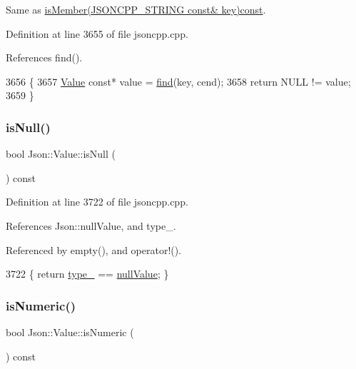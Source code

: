 Same as \hyperlink{class_json_1_1_value_a0c2cd838217b23ee6bde8135de1b30d9}{is\+Member(\+J\+S\+O\+N\+C\+P\+P\+\_\+\+S\+T\+R\+I\+N\+G const\& key)const}. 



Definition at line 3655 of file jsoncpp.\+cpp.



References find().


\begin{DoxyCode}
3656 \{
3657   \hyperlink{class_json_1_1_value_ada6ba1369448fb0240bccc36efaa46f7}{Value} \textcolor{keyword}{const}* value = \hyperlink{class_json_1_1_value_afb007b9ce9b2cf9d5f667a07e5e0349f}{find}(key, cend);
3658   \textcolor{keywordflow}{return} NULL != value;
3659 \}
\end{DoxyCode}
\mbox{\label{class_json_1_1_value_abde4070e21e46dc4f8203f66582cb19f}} 
\subsubsection{\texorpdfstring{is\+Null()}{isNull()}}
{\footnotesize\ttfamily bool Json\+::\+Value\+::is\+Null (\begin{DoxyParamCaption}{ }\end{DoxyParamCaption}) const}



Definition at line 3722 of file jsoncpp.\+cpp.



References Json\+::null\+Value, and type\+\_\+.



Referenced by empty(), and operator!().


\begin{DoxyCode}
3722 \{ \textcolor{keywordflow}{return} \hyperlink{class_json_1_1_value_abd222c2536dc88bf330dedcd076d2356}{type\_} == \hyperlink{namespace_json_a7d654b75c16a57007925868e38212b4ea7d9899633b4409bd3fc107e6737f8391}{nullValue}; \}
\end{DoxyCode}
\mbox{\label{class_json_1_1_value_af961a000cd203c895e44c195ab39b866}} 
\subsubsection{\texorpdfstring{is\+Numeric()}{isNumeric()}}
{\footnotesize\ttfamily bool Json\+::\+Value\+::is\+Numeric (\begin{DoxyParamCaption}{ }\end{DoxyParamCaption}) const}



